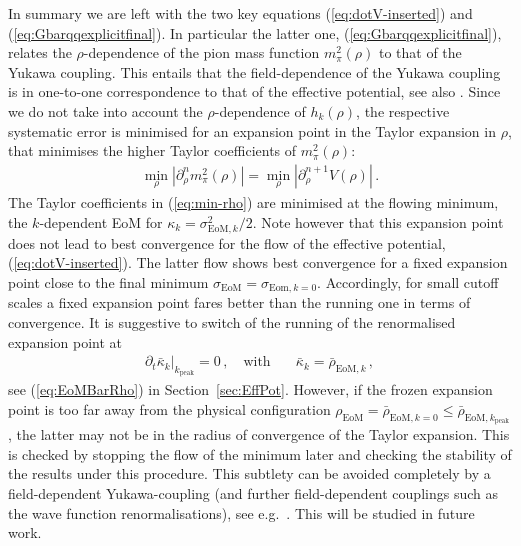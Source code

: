 \documentclass[%
reprint,
superscriptaddress,
showpacs,preprintnumbers,
 amsmath,amssymb,
 aps,
prd,
]{revtex4-1}
\def\eq#1{(\ref{#1})}
\def\sec#1{Section~\ref{#1}}
\begin{document}
In summary we are left with the two key equations
\eq{eq:dotV-inserted} and \eq{eq:Gbarqqexplicitfinal}. In particular
the latter one, \eq{eq:Gbarqqexplicitfinal}, relates the
$\rho$-dependence of the pion mass function $m_\pi^2(\rho)$ to that of
the Yukawa coupling. This entails that the field-dependence of the
Yukawa coupling is in one-to-one correspondence to that of the
effective potential, see also \cite{Pawlowski:2014zaa}. Since we do
not take into account the $\rho$-dependence of $h_k(\rho)$, the
respective systematic error is minimised for an expansion point in the
Taylor expansion in $\rho$, that minimises the higher Taylor
coefficients of $m_\pi^2(\rho)$:
%
\begin{align}\label{eq:min-rho}
  \min_{\rho} |\partial_\rho^n m_\pi^2(\rho)| = \min_{\rho}|
  \partial_\rho^{n+1} V(\rho)|\,.
\end{align}
%
The Taylor coefficients in \eq{eq:min-rho} are minimised at the
flowing minimum, the $k$-dependent EoM for
$\kappa_k = \sigma^2_{\textrm{EoM},k}/2$. Note however that this
expansion point does not lead to best convergence for the flow of the
effective potential, \eq{eq:dotV-inserted}. The latter flow shows best
convergence for a fixed expansion point close to the final minimum
$\sigma_{\textrm{EoM}}=\sigma_{\textrm{Eom},k=0}$. Accordingly, for
small cutoff scales a fixed expansion point fares better than the
running one in terms of convergence. It is suggestive to switch of the
running of the renormalised expansion point at
%
\begin{align}
  \left.  \partial_t \bar \kappa_k\right|_{k_\textrm{peak}} =0\,,
  \quad \textrm{with} \quad &\bar\kappa_k =
                                                             \bar \rho_{\textrm{EoM},k} \,,
\end{align}
see \eq{eq:EoMBarRho} in \sec{sec:EffPot}. However, if the frozen
expansion point is too far away from the physical configuration
$\rho_{\textrm{EoM}}=\bar \rho_{\textrm{EoM},k=0}\leq \bar \rho_{
  \textrm{EoM}, k_{\textrm{peak}}}$, the latter may not be in the
radius of convergence of the Taylor expansion. This is checked by
stopping the flow of the minimum later and checking the stability of
the results under this procedure. This subtlety can be avoided
completely by a field-dependent Yukawa-coupling (and further
field-dependent couplings such as the wave function renormalisations),
see e.g.\ \cite{Pawlowski:2014zaa}. This will be studied in future
work.
\end{document}

